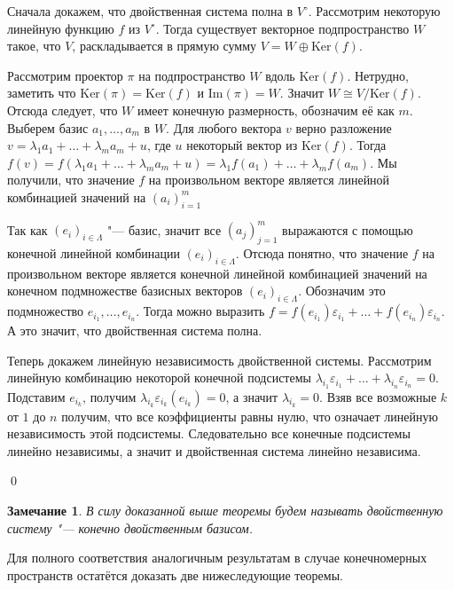 \documentclass[12pt, reqno, a4paper, oneside, notitlepage]{amsart}
\makeatletter
\theoremstyle{mytheoremstyle}
\theoremstyle{myremarkstyle}
\newtheorem{remark}[theorem]{Замечание}
\numberwithin{equation}{section}
\renewenvironment{proof}[1][\proofname]{\par\indent {\bfseries #1\@addpunct{.} }}{\qed}
\makeatother
\begin{document}
\begin{proof}
    
    Сначала докажем, что двойственная система полна в $V^\circ$. Рассмотрим некоторую линейную функцию $f$ из $V^\circ$.
    Тогда существует векторное подпространство $W$ такое, что $V$, раскладывается в прямую сумму ${V = W \oplus \mathrm{Ker} (f)}$.

    Рассмотрим проектор $\pi$ на подпространство $W$ вдоль $\mathrm{Ker}(f)$. Нетрудно, заметить что $\mathrm{Ker}(\pi) = \mathrm{Ker}(f)$ и $\mathrm{Im}(\pi) = W$. Значит $W \cong V/\mathrm{Ker}(f)$.
    Отсюда следует, что $W$ имеет конечную размерность, обозначим её как $m$. Выберем базис $a_1, \dots, a_m$ в $W$.
    Для любого вектора $v$ верно разложение $v = \lambda_1a_1+ \dots +\lambda_ma_m + u$, где $u$ некоторый вектор из $\mathrm{Ker}(f)$. Тогда $f(v) =  f(\lambda_1a_1+ \dots +\lambda_ma_m + u) = \lambda_1f(a_1)+ \dots +\lambda_mf(a_m)$. 
    Мы получили, что значение $f$ на произвольном векторе является линейной комбинацией значений на $(a_i)_{i = 1}^m$

    Так как $(e_i)_{i \in \Lambda}$ "--- базис, значит все $(a_j)_{j = 1}^m$ выражаются с помощью конечной линейной комбинации $(e_i)_{i \in \Lambda}$.
    Отсюда понятно, что значение $f$ на произвольном векторе является конечной линейной комбинацией значений на конечном подмножестве базисных векторов $(e_i)_{i \in \Lambda}$. Обозначим это подмножество $e_{i_1}, \dots, e_{i_n}$.
    Тогда можно выразить $f = f(e_{i_1})\varepsilon_{i_1} + \dots + f(e_{i_n})\varepsilon_{i_n}$.
    А это значит, что двойственная система полна.

    Теперь докажем линейную независимость двойственной системы. Рассмотрим линейную комбинацию некоторой конечной подсистемы $\lambda_{i_1}\varepsilon_{i_1} + \dots + \lambda_{i_n}\varepsilon_{i_n} = 0$. Подставим $e_{i_k}$, получим $\lambda_{i_k}\varepsilon_{i_k}(e_{i_k}) = 0$, а значит $\lambda_{i_k} = 0$. 
    Взяв все возможные $k$ от $1$ до $n$ получим, что все коэффициенты равны нулю, что означает линейную независимость этой подсистемы. Следовательно все конечные подсистемы линейно независимы, а значит и двойственная система линейно независима.

\end{proof}

\begin{remark}
    В силу доказанной выше теоремы будем называть двойственную систему "--- конечно двойственным базисом.
\end{remark}
Для полного соответствия аналогичным результатам в случае конечномерных пространств остатётся доказать две нижеследующие теоремы.
\end{document}
